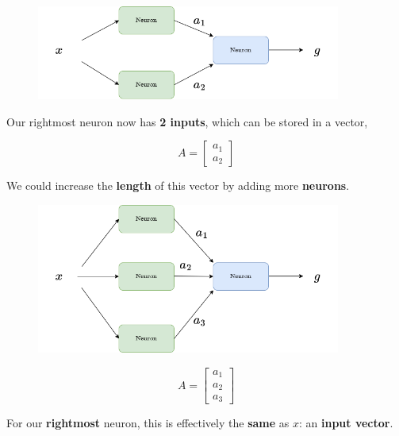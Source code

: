         \begin{figure}[H]
            \centering
            \includegraphics[width=100mm,scale=0.4]{images/nn_images/two_neurons_a.png}
        \end{figure}
        
        Our rightmost neuron now has \textbf{2 inputs}, which can be stored in a vector,
        
        \begin{equation}
            A = 
            \begin{bmatrix}
              a_1 \\ a_2
            \end{bmatrix}
        \end{equation}
        
        We could increase the \textbf{length} of this vector by adding more \textbf{neurons}.
        
        \begin{figure}[H]
            \centering
            \includegraphics[width=100mm,scale=0.4]{images/nn_images/three_parallel.png}
        \end{figure}
        
        \begin{equation}
            A = \begin{bmatrix}
              a_1 \\ a_2 \\ a_3
            \end{bmatrix}
        \end{equation}
        
        For our \textbf{rightmost} neuron, this is effectively the \textbf{same} as $x$: an \textbf{input vector}. 
        
